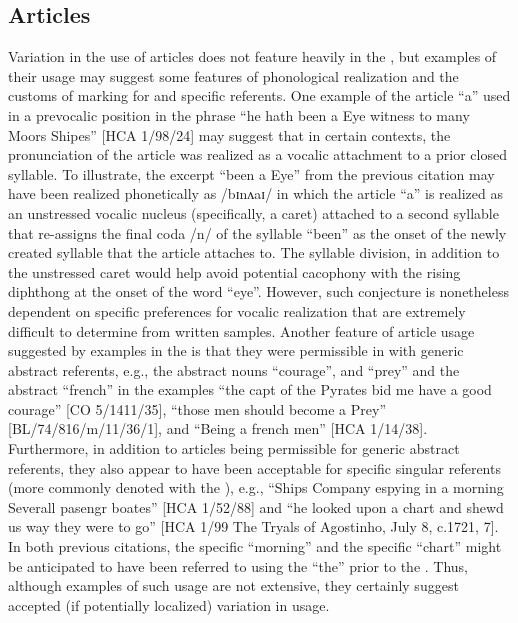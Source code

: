 \subsection{{Articles}}\label{sec:5.3.5}

Variation in the use of  articles does not feature heavily in the , but examples of their usage may suggest some features of phonological realization and the customs of marking for  and specific referents. One example of the  article “a” used in a prevocalic position in the phrase “he hath been a Eye witness to many Moors Shipes” [HCA 1/98/24] may suggest that in certain contexts, the pronunciation of the article was realized as a vocalic attachment to a prior closed syllable. To illustrate, the excerpt “been a Eye” from the previous citation may have been realized phonetically as /b{ɪ}nʌ{aɪ/ in which the article “a” is realized as an unstressed vocalic nucleus (specifically, a caret) attached to a second syllable that re-assigns the final coda /n/ of the syllable “been” as the onset of the newly created syllable that the article attaches to. The syllable division, in addition to the unstressed caret would help avoid potential cacophony with the rising diphthong at the onset of the word “eye”. However, such conjecture is nonetheless dependent on specific preferences for vocalic realization that are extremely difficult to determine from written samples. Another feature of  article usage suggested by examples in the  is that they were permissible in  with generic abstract referents, e.g., the abstract nouns “courage”, and “prey” and the abstract  “french” in the examples} “the capt of the Pyrates bid me have a good courage” [CO 5/1411/35], “those men should become a Prey” [BL/74/816/m/11/36/1], and “Being a french men” [HCA 1/14/38]. Furthermore, in addition to  articles being {permissible for generic abstract referents, they also appear to have been acceptable for specific singular referents (more commonly denoted with the ), e.g.,} “Ships Company espying in a morning Severall pasengr boates” [HCA 1/52/88] and “he looked upon a chart and shewd us way they were to go” [HCA 1/99 The Tryals of Agostinho, July 8, c.1721, 7]. In both previous citations, the specific “morning” and the specific “chart” might be anticipated to have been referred to using the  “the” prior to the . Thus, although examples of such usage are not extensive, they certainly suggest accepted (if potentially localized) variation in usage. 

